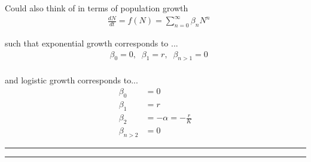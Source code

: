 \documentclass{article}
\begin{document}
Could also think of in terms of population growth 
\begin{align*}
&	\frac{dN}{dt}=f(N)=\sum_{n=0}^\infty \beta_n N^n
\end{align*}

such that exponential growth corresponds to ...
\begin{align*}
& 	\beta_0=0, \;\; \beta_1 = r, \;\; \beta_{n>1}=0\\
\end{align*}

and logistic growth corresponds to...
\begin{align*}
	\beta_0 &= 0\\
	\beta_1 &= r\\
	\beta_2 &= -\alpha = -\frac{r}{K}\\
	\beta_{n>2} & =0
\end{align*}

\rule[0.5ex]{\linewidth}{1pt}
\rule[0.5ex]{\linewidth}{1pt}
\end{document}
